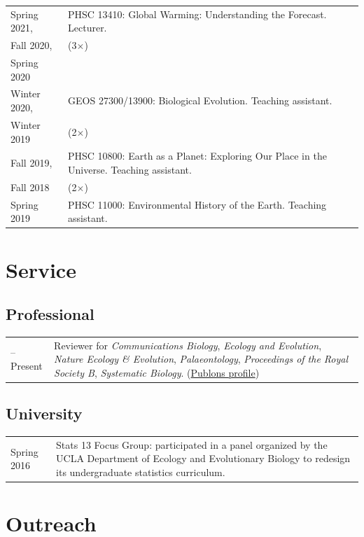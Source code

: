 \documentclass[10pt]{article}
\begin{document}
\newpage

\noindent \begin{tabularx}{\textwidth}{>{\raggedleft\arraybackslash}p{2.2cm} X}
Spring 2021, & PHSC 13410: Global Warming: Understanding the Forecast. Lecturer. \\
Fall 2020, & (3$\times$) \\
Spring 2020 & \\[0.15cm]
Winter 2020, & GEOS 27300/13900: Biological Evolution. Teaching assistant. \\
Winter 2019 & (2$\times$) \\[0.15cm]
Fall 2019, & PHSC 10800: Earth as a Planet: Exploring Our Place in the Universe. Teaching assistant. \\
Fall 2018 & (2$\times$) \\[0.15cm]
Spring 2019 & PHSC 11000: Environmental History of the Earth. Teaching assistant.
\end{tabularx}

\section*{Service}

\subsection*{Professional}

\begin{tabularx}{\textwidth}{>{\raggedleft\arraybackslash}p{2.2cm} X}
2019--Present & Reviewer for \textit{Communications Biology}, \textit{Ecology and Evolution}, \textit{Nature Ecology \& Evolution}, \textit{Palaeontology}, \textit{Proceedings of the Royal Society B}, \textit{Systematic Biology}. (\href{https://publons.com/a/3033367}{Publons profile})
\end{tabularx}

\subsection*{University}

\begin{tabularx}{\textwidth}{>{\raggedleft\arraybackslash}p{2.2cm} X}
Spring 2016 & Stats 13 Focus Group: participated in a panel organized by the UCLA Department of Ecology and Evolutionary Biology to redesign its undergraduate statistics curriculum.
\end{tabularx}

\section*{Outreach}
\end{document}
